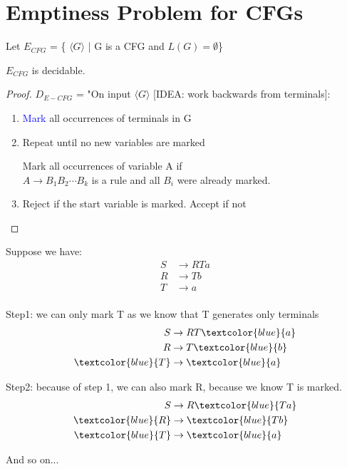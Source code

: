 \section{Emptiness Problem for CFGs}

\begin{theorem}
    Let \(E_{CFG}\) = \{ \(\langle G \rangle \) | G is a CFG and \(L(G) = \emptyset\)\} 

    \(E_{CFG}\) is decidable. 
\end{theorem}
\begin{proof}
    \(D_{E-CFG}\) = "On input \(\langle G \rangle \) [IDEA: work backwards from terminals]:
    \begin{enumerate}
        \item \textcolor{blue}{Mark} all occurrences of terminals in G
        \item Repeat until no new variables are marked

        Mark all occurrences of variable A if\\
        \(A \rightarrow B_1B_2\cdots B_k\) is a rule and all \(B_i\) were already marked. 
        \item Reject if the start variable is marked. Accept if not
    \end{enumerate} 
\end{proof}

\begin{example}
    Suppose we have: 
    \begin{align*}
        S &\rightarrow RTa\\
        R &\rightarrow Tb\\
        T &\rightarrow a\\
    \end{align*}

    Step1: we can only mark T as we know that T generates only terminals
    \begin{align*}
        S &\rightarrow RT\textcolor{blue}{a}\\
        R &\rightarrow T\textcolor{blue}{b}\\
        \textcolor{blue}{T} &\rightarrow \textcolor{blue}{a}\\
    \end{align*}

    Step2: because of step 1, we can also mark R, because we know T is marked.
     \begin{align*}
        S &\rightarrow R\textcolor{blue}{Ta}\\
        \textcolor{blue}{R} &\rightarrow \textcolor{blue}{Tb}\\
        \textcolor{blue}{T} &\rightarrow \textcolor{blue}{a}\\
    \end{align*}

    And so on...
\end{example}

